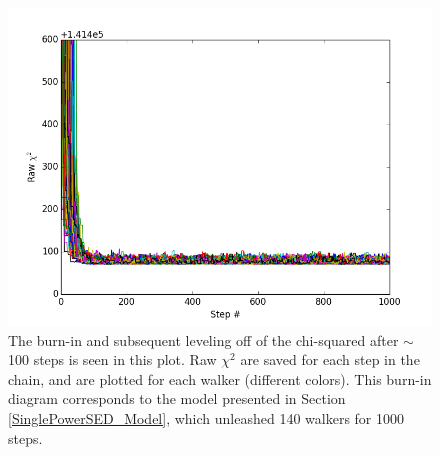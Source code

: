 {{\begin{figure}
\centering
\includegraphics[width = 1\textwidth]{49CET_BurnIn_140x1000_Simplest.png}
\caption{The burn-in and subsequent leveling off of the chi-squared after $\sim$ 100 steps is seen in this plot. Raw $\chi^{2}$ are saved for each step in the chain, and are plotted for each walker (different colors). This burn-in diagram corresponds to the model presented in Section \ref{SinglePowerSED_Model}, which unleashed 140 walkers for 1000 steps.}
\label{fig:49CET_BurnIn}
\end{figure}

}}
